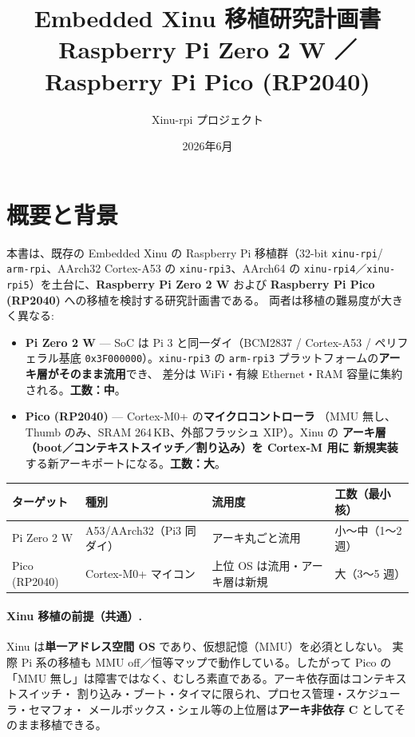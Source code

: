 \documentclass[a4paper,11pt]{ltjsarticle}
\title{\textbf{Embedded Xinu 移植研究計画書}\\[3pt]
  \large Raspberry Pi Zero 2 W ／ Raspberry Pi Pico (RP2040)}
\author{Xinu-rpi プロジェクト}
\date{2026年6月}
\begin{document}
\maketitle
\tableofcontents
\newpage

\section{概要と背景}
本書は、既存の Embedded Xinu の Raspberry Pi 移植群（32-bit \texttt{xinu-rpi}/%
\texttt{arm-rpi}、AArch32 Cortex-A53 の \texttt{xinu-rpi3}、AArch64 の
\texttt{xinu-rpi4}／\texttt{xinu-rpi5}）を土台に、\textbf{Raspberry Pi Zero 2 W}
および \textbf{Raspberry Pi Pico (RP2040)} への移植を検討する研究計画書である。
両者は移植の難易度が大きく異なる:

\begin{itemize}[noitemsep]
  \item \textbf{Pi Zero 2 W} --- SoC は Pi 3 と同一ダイ（BCM2837 / Cortex-A53 /
        ペリフェラル基底 \texttt{0x3F000000}）。\texttt{xinu-rpi3} の
        \texttt{arm-rpi3} プラットフォームの\textbf{アーキ層がそのまま流用}でき、
        差分は WiFi・有線 Ethernet・RAM 容量に集約される。\textbf{工数：中}。
  \item \textbf{Pico (RP2040)} --- Cortex-M0+ の\textbf{マイクロコントローラ}
        （MMU 無し、Thumb のみ、SRAM 264\,KB、外部フラッシュ XIP）。Xinu の
        \textbf{アーキ層（boot／コンテキストスイッチ／割り込み）を Cortex-M 用に
        新規実装}する新アーキポートになる。\textbf{工数：大}。
\end{itemize}

\begin{center}\small
\begin{tabular}{@{}llll@{}}
\toprule
ターゲット & 種別 & 流用度 & 工数（最小核）\\
\midrule
Pi Zero 2 W & A53/AArch32（Pi3 同ダイ） & アーキ丸ごと流用 & 小〜中（1〜2 週）\\
Pico (RP2040) & Cortex-M0+ マイコン & 上位 OS は流用・アーキ層は新規 & 大（3〜5 週）\\
\bottomrule
\end{tabular}
\end{center}

\paragraph{Xinu 移植の前提（共通）.}
Xinu は\textbf{単一アドレス空間 OS} であり、仮想記憶（MMU）を必須としない。
実際 Pi 系の移植も MMU off／恒等マップで動作している。したがって Pico の
「MMU 無し」は障害ではなく、むしろ素直である。アーキ依存面はコンテキストスイッチ・
割り込み・ブート・タイマに限られ、プロセス管理・スケジューラ・セマフォ・
メールボックス・シェル等の上位層は\textbf{アーキ非依存 C} としてそのまま移植できる。
\end{document}
